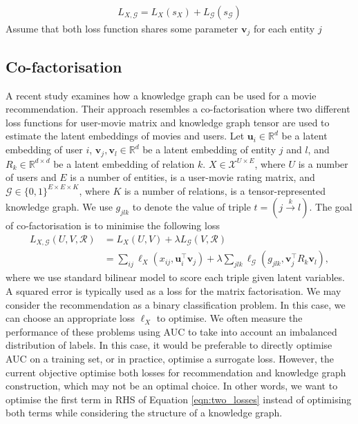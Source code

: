 \documentclass{article} %
\theoremstyle{definition}
\newcommand\mc{\mathcal} %
\newcommand\ts{\mathcal} %
\newcommand\mt{} %
\newcommand\vt{\mathbf} %
\newcommand\triple[3]{(#1 \stackrel{#2}\rightarrow #3)}
\begin{document}
\begin{align}
L_{\mt{X},\ts{G}} = L_\mt{X}(s_\mt{X}) + L_\ts{G}(s_\ts{G})
\end{align}
Assume that both loss function shares some parameter $\vt{v}_j$ for each entity $j$


\subsection{Co-factorisation}

A recent study \cite{Zhang2016} examines how a knowledge graph can be used for a movie recommendation. Their approach resembles a co-factorisation where two different loss functions for user-movie matrix and knowledge graph tensor are used to estimate the latent embeddings of movies and users.
Let $\vt{u}_i \in \mathbb{R}^d$ be a latent embedding of user $i$, $\vt{v}_j, \vt{v}_l \in \mathbb{R}^d$ be a latent embedding of entity $j$ and $l$, and $\mt{R}_{k} \in \mathbb{R}^{d\times d}$ be a latent embedding of relation $k$. $X \in \mc{X}^{U \times E}$, where $U$ is a number of users and $E$ is a number of entities, is a user-movie rating matrix, and $\ts{G} \in \{0,1\}^{E\times E \times K}$, where $K$ is a number of relations, is a tensor-represented knowledge graph. We use $g_{jlk}$ to denote the value of triple $t=\triple{j}{k}{l}$. The goal of co-factorisation is to minimise the following loss
\begin{align}
\label{eqn:two_losses}
L_{X, \ts{G}}(\mt{U}, \mt{V}, \ts{R}) & = L_X(\mt{U}, \mt{V}) + \lambda L_\ts{G}(\mt{V}, \ts{R})\\
& = \sum_{ij}\ell_X(x_{ij}, \vt{u}_{i}^\top \vt{v}_j) + \lambda \sum_{jlk}\ell_\ts{G}(g_{jlk}, \vt{v}_j^\top \mt{R}_{k} \vt{v}_{l}), \label{eqn:two_losses}
\end{align}
where we use standard bilinear model to score each triple given latent variables.
A squared error is typically used as a loss for the matrix factorisation. We may consider the recommendation as a binary classification problem. In this case, we can choose an appropriate loss $\ell_X$ to optimise.  We often measure the performance of these problems using AUC to take into account an imbalanced distribution of labels. In this case, it would be preferable to directly optimise AUC on a training set, or in practice, optimise a surrogate loss. However, the current objective optimise both losses for recommendation and knowledge graph construction, which may not be an optimal choice. In other words, we want to optimise the first term in RHS of Equation \ref{eqn:two_losses} instead of optimising both terms while considering the structure of a knowledge graph.
\end{document}
